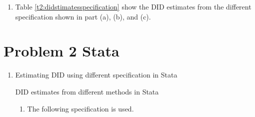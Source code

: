 \documentclass{article}
\begin{document}
\begin{enumerate}
\begin{enumerate}
    \item Table \ref{t2:didstimatesspecification} show the DID estimates from the different specification shown in part (a), (b), and (c).
    
\end{enumerate}
\end{enumerate} 

\section*{Problem 2 Stata}
\begin{enumerate}
\item Estimating DID using different specification in Stata
\begin{table}[H]\centering
    \begin{threeparttable}
    \caption{DID estimates from different methods in Stata}
    \label{t3:stata_estimates}
    
    \end{threeparttable}
\end{table}
\begin{enumerate}
    \item The following specification is used.
\end{enumerate}
\end{enumerate}
    
\end{document}
